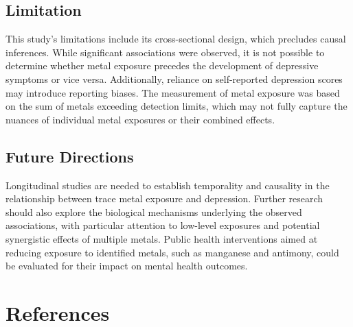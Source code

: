 \documentclass[
  man,floatsintext]{apa6}
\begin{document}
\hypertarget{limitation}{%
\subsection{Limitation}\label{limitation}}

This study's limitations include its cross-sectional design, which precludes causal inferences. While significant associations were observed, it is not possible to determine whether metal exposure precedes the development of depressive symptoms or vice versa. Additionally, reliance on self-reported depression scores may introduce reporting biases. The measurement of metal exposure was based on the sum of metals exceeding detection limits, which may not fully capture the nuances of individual metal exposures or their combined effects.

\hypertarget{future-directions}{%
\subsection{Future Directions}\label{future-directions}}

Longitudinal studies are needed to establish temporality and causality in the relationship between trace metal exposure and depression. Further research should also explore the biological mechanisms underlying the observed associations, with particular attention to low-level exposures and potential synergistic effects of multiple metals. Public health interventions aimed at reducing exposure to identified metals, such as manganese and antimony, could be evaluated for their impact on mental health outcomes.

\newpage

\hypertarget{references}{%
\section{References}\label{references}}
\end{document}
